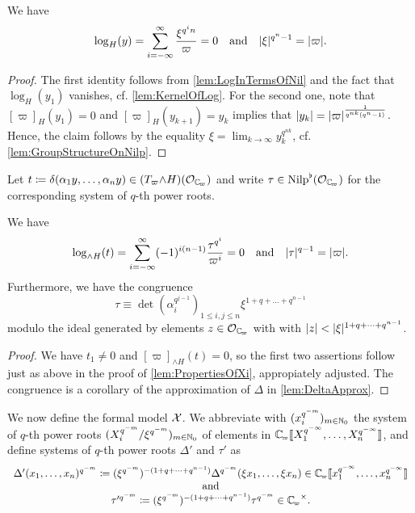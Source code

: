 \documentclass[../main.tex]{subfiles}
\begin{document}
\begin{lem}\label{lem:PropertiesOfXi}
  We have 
  \begin{equation*}
    \log_H(y) = \sum_{i = -\infty}^ \infty \frac{\xi^{q^in}}{\varpi} = 0
    \quad \text{and} \quad
    \lvert \xi \rvert^{q^n-1} = \lvert \varpi \rvert.
  \end{equation*}
\begin{proof}
  The first identity follows from \cref{lem:LogInTermsOfNil} and the fact that
  $\log_H(y_1)$ vanishes, cf. \cref{lem:KernelOfLog}. For the second one, note
  that $[\varpi]_H(y_1) = 0$ and $[\varpi]_H(y_{k+1}) = y_k$ implies that
  $\lvert y_k \rvert = \lvert \varpi \rvert^{\frac{1}{q^{nk}(q^n-1)}}$. Hence, the claim follows
  by the equality $\xi = \lim_{k \to \infty} y_k^{q^{nk}}$, cf. 
  \cref{lem:GroupStructureOnNilp}.
\end{proof}
\end{lem}

Let $t \coloneq \delta(\alpha_1 y, \dots, \alpha_n y) \in (T_\varpi {\wedge H})(\cO_\Cp)$
and write $\tau \in \Nilp^\flat(\cO_\Cp)$ for the corresponding system of $q$-th 
power roots.

\begin{lem}\label{lem:PropertiesOfTau}
  We have 
  \begin{equation*}
    \log_{\wedge H}(t) = 
    \sum_{i = -\infty}^\infty (-1)^{i(n-1)} \frac{\tau^{q^i}}{\varpi^i} = 0 
    \quad \text{and} \quad 
    \lvert \tau \rvert^{q-1} = \lvert \varpi \rvert.
  \end{equation*}
  Furthermore, we have the congruence
  \begin{equation*}
    \tau \equiv \det(\alpha_i^{q^{j-1}})_{1 \leq i,j \leq n} \xi^{1 + q + \dots + q^{n-1}}
  \end{equation*}
  modulo the ideal generated by elements $z \in \cO_\Cp$ with with 
  $\lvert z \rvert < \lvert \xi \rvert^{1 + q + \dots + q^{n-1}}$. 
\begin{proof}
  We have $t_1 \neq 0$ and $[\varpi]_{\wedge H}(t) = 0$, so the first two
  assertions follow just as above in the proof of 
  \cref{lem:PropertiesOfXi}, appropiately adjusted. The congruence is a
  corollary of the approximation of $\Delta$ in \cref{lem:DeltaApprox}.
\end{proof}
\end{lem}

We now define the formal model $\mathcal{X}$. We abbreviate with $(x_i^{q^{-m}})_{m \in
\mathbb{N}_0}$ the system of 
$q$-th power roots $(X_i^{q^{-m}}/\xi^{q^{-m}})_{m \in \mathbb{N}_0}$ of elements in
$\Cp \llbr X_1^{q^{-\infty}}, \dots, X_n^{q^{-\infty}}\rrbr$, and define
systems of $q$-th power roots $\Delta'$ and $\tau'$ as
\begin{equation*}
  \begin{array}c
  \Delta'(x_1, \dots, x_n)^{q^{-m}} \coloneq (\xi^{q^{-m}})^{-(1 + q + \dots +
  q^{n-1})} \Delta^{q^{-m}}(\xi x_1, \dots, \xi x_n) \in \Cp \llbr x_1^{q^{-\infty}}, \dots
  , x_n^{q^{-\infty}}\rrbr  \\
  \text{and} \\
  \tau'^{q^{-m}} \coloneq (\xi^{q^{-m}})^{-(1 + q + \dots + q^{n-1})} \tau^{q^{-m}} \in
  \Cp^\times.
  \end{array}
\end{equation*}
\end{document}
